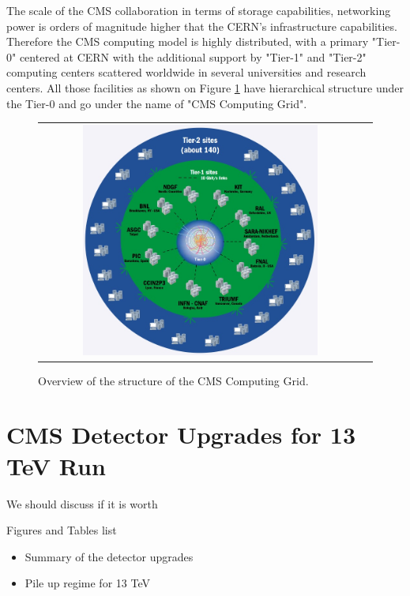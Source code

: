 The scale of the CMS collaboration in terms of storage capabilities, networking power is orders of magnitude higher that the CERN's infrastructure capabilities. Therefore the CMS computing model is highly distributed, with a primary "Tier-0" centered at CERN with the additional support by "Tier-1" and "Tier-2" computing centers scattered worldwide in several universities and research centers. All those facilities as shown on Figure \ref{fig:CMS_grid} have hierarchical structure under the Tier-0 and go under the name of "CMS Computing Grid".

\begin{figure}[tbh!]
	\centering
	\begin{tabular}{cc}
		\includegraphics[width=0.75\textwidth]{detector/pics/CMS_grid.jpg}
	\end{tabular}
	\caption{Overview of the structure of the CMS Computing Grid.}
	\label{fig:CMS_grid}
\end{figure}

\section{CMS Detector Upgrades for 13 TeV Run}

We should discuss if it is worth

Figures and Tables list

\begin{itemize}
	\item Summary of the detector upgrades
	\item Pile up regime for 13 TeV
\end{itemize}